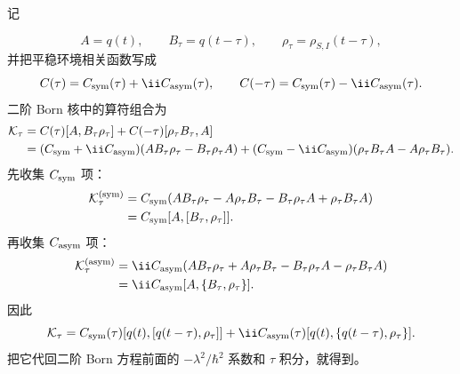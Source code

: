 
\begin{derivation}
记

\begin{equation*}
A=q(t),\qquad B_\tau=q(t-\tau),\qquad \rho_\tau=\rho_{S,I}(t-\tau),
\end{equation*}
并把平稳环境相关函数写成
\begin{equation*}
C(\tau)=C_{\rm sym}(\tau)+\ii C_{\rm asym}(\tau),\qquad
C(-\tau)=C_{\rm sym}(\tau)-\ii C_{\rm asym}(\tau).
\end{equation*}
二阶 Born 核中的算符组合为
\begin{align*}
\mathcal K_\tau
={}&C(\tau)[A,B_\tau\rho_\tau]
+C(-\tau)[\rho_\tau B_\tau,A]\\
={}&(C_{\rm sym}+\ii C_{\rm asym})(AB_\tau\rho_\tau-B_\tau\rho_\tau A)
+(C_{\rm sym}-\ii C_{\rm asym})(\rho_\tau B_\tau A-A\rho_\tau B_\tau).
\end{align*}
先收集 $C_{\rm sym}$ 项：
\begin{align*}
\mathcal K_\tau^{({\rm sym})}
&=C_{\rm sym}(AB_\tau\rho_\tau-A\rho_\tau B_\tau-B_\tau\rho_\tau A+\rho_\tau B_\tau A)\\
&=C_{\rm sym}[A,[B_\tau,\rho_\tau]].
\end{align*}
再收集 $C_{\rm asym}$ 项：
\begin{align*}
\mathcal K_\tau^{({\rm asym})}
&=\ii C_{\rm asym}(AB_\tau\rho_\tau+A\rho_\tau B_\tau-B_\tau\rho_\tau A-\rho_\tau B_\tau A)\\
&=\ii C_{\rm asym}[A,\{B_\tau,\rho_\tau\}].
\end{align*}
因此
\begin{equation*}
\mathcal K_\tau
=C_{\rm sym}(\tau)[q(t),[q(t-\tau),\rho_\tau]]
+\ii C_{\rm asym}(\tau)[q(t),\{q(t-\tau),\rho_\tau\}].
\end{equation*}
把它代回二阶 Born 方程前面的 $-\lambda^2/\hbar^2$ 系数和 $\tau$ 积分，就得到。
\end{derivation}

